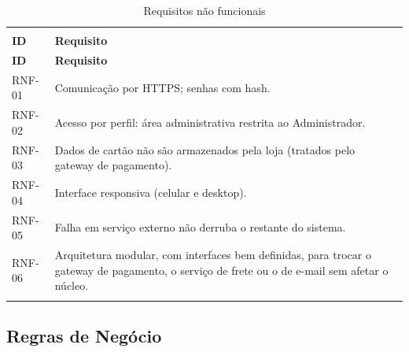 \documentclass[12pt,a4paper]{article}
\begin{document}
{\setlength{\arrayrulewidth}{0.3pt}\renewcommand{\arraystretch}{1.05}
\begin{xltabular}{\textwidth}{>{\raggedright\arraybackslash}p{1.6cm}|>{\raggedright\arraybackslash}X}
\caption{Requisitos não funcionais}\\
\toprule{}
\textbf{ID} & \textbf{Requisito}\\ \midrule{}
\endfirsthead
{}\toprule{}
\textbf{ID} & \textbf{Requisito}\\ \midrule{}
\endhead
\endlastfoot
RNF-01 & Comunicação por HTTPS; senhas com hash.\\ \hline
RNF-02 & Acesso por perfil: área administrativa restrita ao Administrador.\\ \hline
RNF-03 & Dados de cartão não são armazenados pela loja (tratados pelo gateway de pagamento).\\ \hline
RNF-04 & Interface responsiva (celular e desktop).\\ \hline
RNF-05 & Falha em serviço externo não derruba o restante do sistema.\\ \hline
RNF-06 & Arquitetura modular, com interfaces bem definidas, para trocar o gateway de pagamento, o serviço de frete ou o de e-mail sem afetar o núcleo.\\ \bottomrule
\end{xltabular}}

\subsection*{Regras de Negócio}
\end{document}
